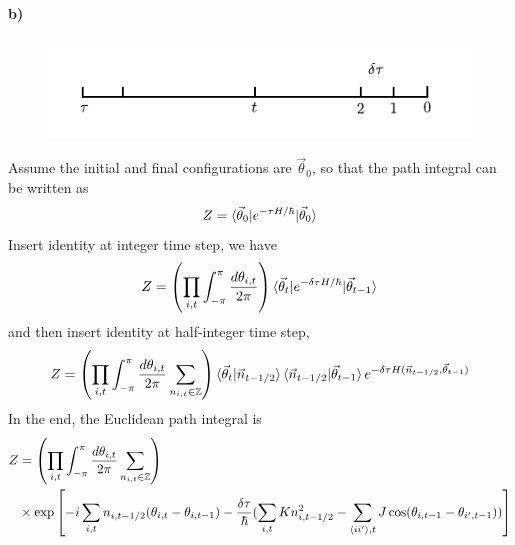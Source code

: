 \paragraph*{b)}
\begin{figure}
    \centering
    \includegraphics{Page2.pdf}
\end{figure}
Assume the initial and final configurations are $\vec{\theta}_0$, so that the path integral can be written as
\begin{equation}
    Z = \braket{\vec{\theta}_0 | e^{-\tau H/\hbar} | \vec{\theta}_0}
\end{equation}
Insert identity at integer time step, we have
\begin{equation}
    Z 
    = \left(\prod_{i, t} \int_{-\pi}^{\pi} \frac{d\theta_{i, t}}{2\pi}\right)
    \braket{\vec{\theta}_t | e^{-\delta \tau H/\hbar} | \vec{\theta}_{t-1}} 
\end{equation}
and then insert identity at half-integer time step, 
\begin{equation}
    Z 
    = \left(\prod_{i, t} \int_{-\pi}^{\pi} \frac{d\theta_{i, t}}{2\pi} \sum_{n_{i, t} \in \mathbb{Z} }\right)
    \braket{\vec{\theta}_t | \vec{n}_{t-1/2}} \braket{\vec{n}_{t-1/2}|\vec{\theta}_{t-1}}
    e^{-\delta \tau H(\vec{n}_{t-1/2}, \vec{\theta}_{t-1})}
\end{equation}
In the end, the Euclidean path integral is
\begin{equation}
    \begin{aligned}
        Z 
        &= \left(
            \prod_{i, t} \int_{-\pi}^{\pi} \frac{d\theta_{i, t}}{2\pi} 
            \sum_{n_{i, t} \in \mathbb{Z} }
            \right)\\
        & \times \exp \left[
            -i\sum_{i, t} n_{i, t-1/2} (\theta_{i, t} - \theta_{i, t-1}) 
            -\frac{\delta \tau}{\hbar} (
            \sum_{i, t} K n_{i, t-1/2}^2 
            - \sum_{\braket{ii'}, t} J \cos(\theta_{i, t-1} - \theta_{i', t-1})) 
        \right]          
    \end{aligned}
\end{equation}
